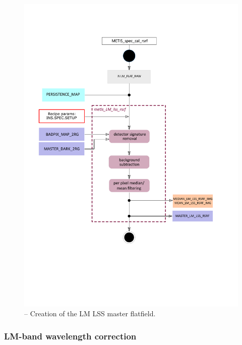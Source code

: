 \begin{figure}[ht]
  \centering
  \includegraphics[width=0.5\textheight]{figures/metis_lm_lss_flat.pdf}
  \caption[Recipe: ]{ --
    Creation of the LM LSS master flatfield.}
  \label{Fig:rec_lm_lss_flat}
\end{figure}
\clearpage

\subsubsection{LM-band wavelength correction}
\label{sssec:LM_LSS_wave}

